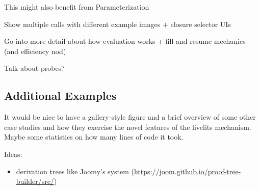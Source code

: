 This might also benefit from Parameterization

Show multiple calls with different example images + closure selector UIs

Go into more detail about how evaluation works + fill-and-resume mechanics (and efficiency nod)

Talk about probes?

\subsection{Additional Examples}\label{sec:additional-examples}
It would be nice to have a gallery-style figure and a brief overview of some other case studies
and how they exercise the novel features of the livelits mechanism. Maybe some statistics on how
many lines of code it took.

Ideas:
\begin{itemize}
  \item derivation trees like Joomy's system (\url{https://joom.github.io/proof-tree-builder/src/})
\end{itemize}